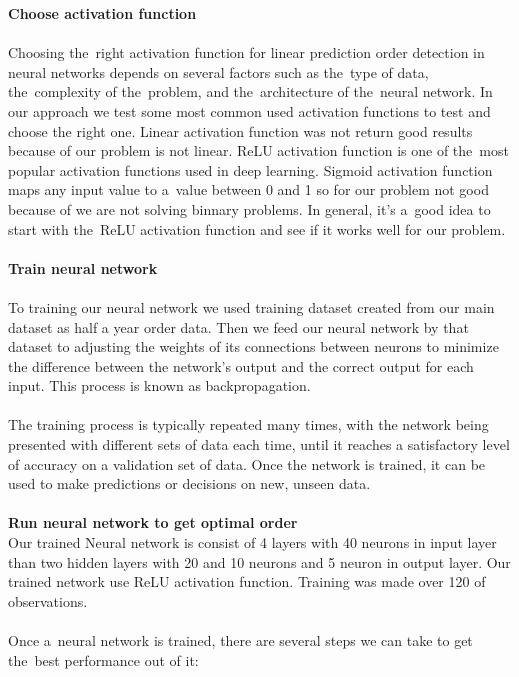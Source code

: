         \textbf{Choose activation function}\\
        \\
        Choosing the~right activation function for linear prediction order detection in neural networks depends on
        several factors such as the~type of data, the~complexity of the~problem, and the~architecture of the~neural
        network. In our approach we test some most common used activation functions to test and choose the right one.
        Linear activation function was not return good results because of our problem is not linear. ReLU activation function is one of the~most popular activation functions used in deep learning. Sigmoid activation function
        maps any input value to a~value between 0 and 1 so for our problem not good because of we are not solving binnary problems. In general, it's a~good idea to start with the~ReLU activation function and see if it works well for our problem.\\
        \\  
        \textbf{Train neural network}\\
        \\
        To training our neural network we used training dataset created from our main dataset as half a year order data. Then we feed our neural network by that dataset to adjusting the weights of its connections between neurons to minimize the difference between the network's output and the correct output for each input. This process is known as backpropagation.\\
        \\
        The training process is typically repeated many times, with the network being presented with different sets of data each time, until it reaches a satisfactory level of accuracy on a validation set of data. Once the network is trained, it can be used to make predictions or decisions on new, unseen data.\\
        \\
        \textbf{Run neural network to get optimal order}\\
        Our trained Neural network is consist of 4 layers with 40 neurons in input layer than two hidden layers with 20 and 10 neurons and 5 neuron in output layer. Our trained network use ReLU activation function. Training was made over 120 of observations.\\
        \\
        Once a~neural network is trained, there are several steps we can take to get the~best performance out of it:
